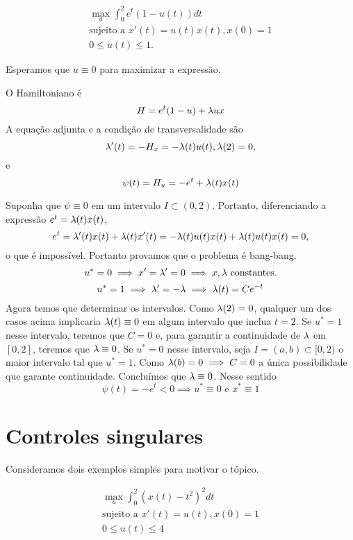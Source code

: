 \begin{example}
    \begin{gather*}
        \max_u \int_0^2 e^t(1 - u(t))dt \\ 
        \text{sujeito a  }x'(t) = u(t)x(t), x(0) = 1 \\
        0 \le u(t) \le 1.
    \end{gather*}

    Esperamos que $u \equiv 0$ para maximizar a expressão. 
\end{example}

O Hamiltoniano é 
$$
H = e^t(1 - u) + \lambda u x
$$
A equação adjunta e a condição de transversalidade são 
$$
\lambda '(t) = - H_x = - \lambda(t)u(t), \lambda(2) = 0,
$$
e
$$
\psi(t) = H_u = -e^t + \lambda(t)x(t)
$$

Suponha que $\psi \equiv 0$ em um intervalo $I \subset (0,2)$. Portanto,
diferenciando a expressão $e^t = \lambda(t)x(t)$, 
$$
e^t = \lambda '(t)x(t) + \lambda(t) x'(t) = -\lambda(t)u(t)x(t) + \lambda(t)u(t)x(t) = 0,
$$
o que é impossível. Portanto provamos que o problema é bang-bang. 
$$
u^* = 0 \implies x' = \lambda ' = 0 \implies x, \lambda \text{ constantes.}
$$
$$
u^* = 1\implies \lambda' = -\lambda \implies \lambda(t) = Ce^{-t}
$$
Agora temos que determinar os intervalos. Como $\lambda(2) = 0$, qualquer um dos
casos acima implicaria $\lambda(t) \equiv 0$ em algum intervalo que inclua $t=2$. 
Se $u^* = 1$ nesse intervalo, teremos que $C = 0$ e, para garantir a
continuidade de $\lambda$ em $[0,2]$, teremos que $\lambda \equiv 0$. Se $u^* = 0$
nesse intervalo, seja $I = (a,b) \subset [0,2)$ o maior intervalo tal que $u^* =
1$. Como $\lambda(b) = 0 \implies C = 0$ a única possibilidade que garante
continuidade. Concluímos que $\lambda \equiv 0$. Nesse sentido 
$$
\psi(t) = -e^t < 0 \implies u^* \equiv 0 \text{ e }x^* \equiv 1
$$

\section{Controles singulares}

Consideramos dois exemplos simples para motivar o tópico. 

\begin{example}
    \begin{gather*}
        \max_u \int_0^2 (x(t) - t^2)^2 dt \\
        \text{sujeito a  }x'(t) = u(t), x(0) = 1 \\
        0 \leq u(t) \leq 4
    \end{gather*}
\end{example}

